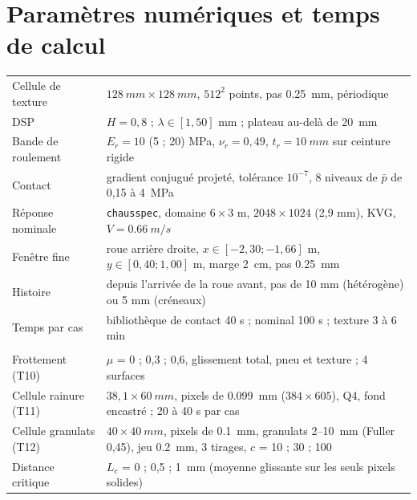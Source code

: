 \documentclass[11pt,a4paper]{article}
\newcommand{\cs}{\texttt{chausspec}}
\begin{document}
\section{Paramètres numériques et temps de calcul}\label{ann:param}
\begin{center}\small
\begin{tabular}{p{6.2cm}p{8.3cm}}
\toprule
Cellule de texture & $\SI{128}{mm}\times\SI{128}{mm}$, $512^2$ points, pas \SI{0.25}{mm}, périodique\\
DSP & $H=0{,}8$ ; $\lambda\in[1,50]$ mm ; plateau au-delà de \SI{20}{mm}\\
Bande de roulement & $E_r=10$ (5 ; 20) MPa, $\nu_r=0{,}49$, $t_r=\SI{10}{mm}$ sur ceinture rigide\\
Contact & gradient conjugué projeté, tolérance $10^{-7}$, 8 niveaux de $\bar p$ de 0,15 à \SI{4}{MPa}\\
Réponse nominale & \cs, domaine $6\times3$ m, $2048\times1024$ (2,9 mm), KVG, $V=\SI{0.66}{m/s}$\\
Fenêtre fine & roue arrière droite, $x\in[-2{,}30;-1{,}66]$ m, $y\in[0{,}40;1{,}00]$ m, marge \SI{2}{cm}, pas \SI{0.25}{mm}\\
Histoire & depuis l'arrivée de la roue avant, pas de 10 mm (hétérogène) ou 5 mm (créneaux)\\
Temps par cas & bibliothèque de contact 40 s ; nominal 100 s ; texture 3 à 6 min\\
\addlinespace
\multicolumn{2}{l}{\emph{Niveau 2}}\\
Frottement (T10) & $\mu$ = 0 ; 0,3 ; 0,6, glissement total, pneu et texture ; 4 surfaces\\
Cellule rainure (T11) & $38{,}1\times\SI{60}{mm}$, pixels de \SI{0.099}{mm} ($384\times605$), Q4, fond encastré ; 20 à 40 s par cas\\
Cellule granulats (T12) & $40\times\SI{40}{mm}$, pixels de \SI{0.1}{mm}, granulats 2--\SI{10}{mm} (Fuller 0,45), jeu \SI{0.2}{mm}, 3 tirages, $c$ = 10 ; 30 ; 100\\
Distance critique & $L_c$ = 0 ; 0,5 ; \SI{1}{mm} (moyenne glissante sur les seuls pixels solides)\\
\bottomrule
\end{tabular}
\end{center}
\end{document}

